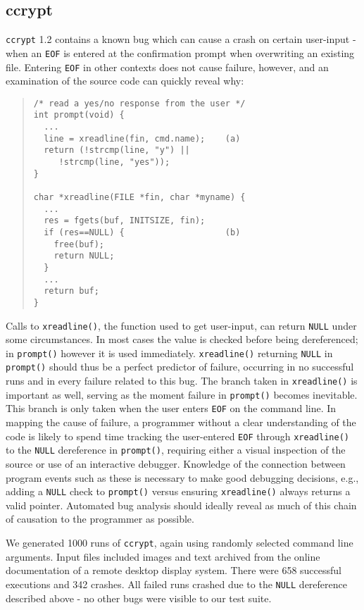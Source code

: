 \subsection{ccrypt}
\texttt{ccrypt} 1.2 contains a known bug which can cause a crash on certain user-input - when an \texttt{EOF} is entered at the confirmation prompt when overwriting an existing file.  Entering \texttt{EOF} in other contexts does not cause failure, however, and an examination of the source code can quickly reveal why:
\begin{quote}
\begin{verbatim}
/* read a yes/no response from the user */
int prompt(void) {
  ...
  line = xreadline(fin, cmd.name);    (a)
  return (!strcmp(line, "y") ||
     !strcmp(line, "yes"));
}

char *xreadline(FILE *fin, char *myname) {
  ...
  res = fgets(buf, INITSIZE, fin);
  if (res==NULL) {                    (b)
    free(buf);
    return NULL;
  }
  ...
  return buf;
}

\end{verbatim}
\end{quote}
Calls to \texttt{xreadline()}, the function used to get user-input, can return \texttt{NULL} under some circumstances.  In most cases the value is checked before being dereferenced; in \texttt{prompt()} however it is used immediately.  \texttt{xreadline()} returning \texttt{NULL} in \texttt{prompt()} should thus be a perfect predictor of failure, occurring in no successful runs and in every failure related to this bug.  The branch taken in \texttt{xreadline()} is important as well, serving as the moment failure in \texttt{prompt()} becomes inevitable.  This branch is only taken when the user enters \texttt{EOF} on the command line.  In mapping the cause of failure, a programmer without a clear understanding of the code is likely to spend time tracking the user-entered \texttt{EOF} through \texttt{xreadline()} to the \texttt{NULL} dereference in \texttt{prompt()}, requiring either a visual inspection of the source or use of an interactive debugger.  Knowledge of the connection between program events such as these is necessary to make good debugging decisions, e.g., adding a \texttt{NULL} check to \texttt{prompt()} versus ensuring \texttt{xreadline()} always returns a valid pointer.  Automated bug analysis should ideally reveal as much of this chain of causation to the programmer as possible.

We generated 1000 runs of \texttt{ccrypt}, again using randomly selected command line arguments.  Input files included images and text archived from the online documentation of a remote desktop display system.  There were 658 successful executions and 342 crashes.  All failed runs crashed due to the \texttt{NULL} dereference described above - no other bugs were visible to our test suite.

